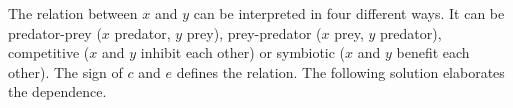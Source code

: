 The relation between $x$ and $y$ can be interpreted in four different ways. It can be predator-prey ($x$ predator, $y$ prey), prey-predator ($x$ prey, $y$ predator), competitive ($x$ and $y$ inhibit each other) or symbiotic ($x$ and $y$ benefit each other). The sign of $c$ and $e$ defines the relation. The following solution elaborates the dependence. 